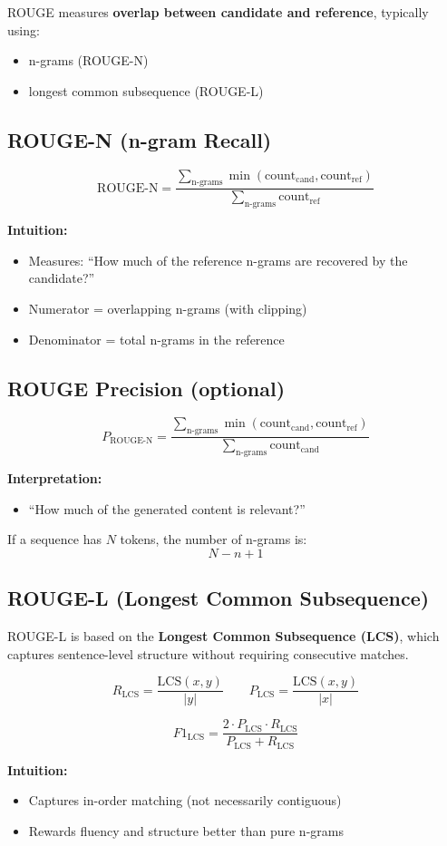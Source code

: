 \documentclass[10pt,a4paper]{article}
\begin{document}
ROUGE measures \textbf{overlap between candidate and reference}, typically using:
\begin{itemize}
    \item n-grams (ROUGE-N)
    \item longest common subsequence (ROUGE-L)
\end{itemize}

\subsection{ROUGE-N (n-gram Recall)}

\[
\text{ROUGE-N} =
\frac{\sum\limits_{\text{n-grams}} \min(\text{count}_{\text{cand}}, \text{count}_{\text{ref}})}
{\sum\limits_{\text{n-grams}} \text{count}_{\text{ref}}}
\]

\textbf{Intuition:}
\begin{itemize}
    \item Measures: ``How much of the reference n-grams are recovered by the candidate?''
    \item Numerator = overlapping n-grams (with clipping)
    \item Denominator = total n-grams in the reference
\end{itemize}

\subsection{ROUGE Precision (optional)}

\[
P_{\text{ROUGE-N}} =
\frac{\sum\limits_{\text{n-grams}} \min(\text{count}_{\text{cand}}, \text{count}_{\text{ref}})}
{\sum\limits_{\text{n-grams}} \text{count}_{\text{cand}}}
\]

\textbf{Interpretation:}
\begin{itemize}
    \item ``How much of the generated content is relevant?''
\end{itemize}


If a sequence has $N$ tokens, the number of n-grams is:
\[
N - n + 1
\]

\subsection{ROUGE-L (Longest Common Subsequence)}

ROUGE-L is based on the \textbf{Longest Common Subsequence (LCS)}, which captures sentence-level structure without requiring consecutive matches.

\[
R_{\text{LCS}} = \frac{\text{LCS}(x,y)}{|y|}
\quad\quad
P_{\text{LCS}} = \frac{\text{LCS}(x,y)}{|x|}
\]

\[
F1_{\text{LCS}} =
\frac{2 \cdot P_{\text{LCS}} \cdot R_{\text{LCS}}}
{P_{\text{LCS}} + R_{\text{LCS}}}
\]

\textbf{Intuition:}
\begin{itemize}
    \item Captures in-order matching (not necessarily contiguous)
    \item Rewards fluency and structure better than pure n-grams
\end{itemize}
\end{document}
